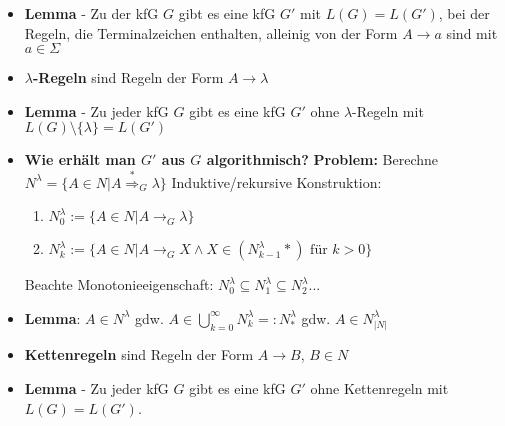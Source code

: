 \documentclass[12pt, a4paper]{article}
\begin{document}
\begin{itemize}
		\item \textbf{Lemma} - Zu der kfG $G$ gibt es eine kfG $G'$ mit $L(G)=L(G')$, bei der Regeln, die
		Terminalzeichen enthalten, alleinig von der Form $A\rightarrow a$ sind mit $a\in\Sigma$
		
		\item \textbf{$\lambda$-Regeln} sind Regeln der Form $A\rightarrow\lambda$
		
		\item \textbf{Lemma} - Zu jeder kfG $G$ gibt es eine kfG $G'$ ohne $\lambda$-Regeln mit $L(G)\setminus\{\lambda\}=L(G')$
		
		\item \textbf{Wie erhält man $G'$ aus $G$ algorithmisch?}
			\subitem \textbf{Problem:} Berechne $N^{\lambda}=\{A\in N|A\overset{\ast}{\Rightarrow}_{G}\lambda\}$
			\subitem Induktive/rekursive Konstruktion:
			\begin{enumerate}
				\item $N^{\lambda}_{0}:=\{A\in N|A\rightarrow_{G}\lambda \}$
				\item $N^{\lambda}_{k}:=\{A\in N|A\rightarrow_{G}X\wedge X\in(N^{\lambda}_{k-1}*)\text{ für }k>0 \}$
			\end{enumerate}
			\subitem Beachte Monotonieeigenschaft: $N^{\lambda}_{0}\subseteq N^{\lambda}_{1}\subseteq N^{\lambda}_{2}...$
			
		\item \textbf{Lemma}: $A\in N^{\lambda}$ gdw. $A\in\bigcup^{\infty}_{k=0}N^{\lambda}_{k}=:N^{\lambda}_{*}$ gdw. $A\in N^{\lambda}_{|N|}$
		
		\item \textbf{Kettenregeln} sind Regeln der Form $A\rightarrow B$, $B\in N$
		
		\item \textbf{Lemma} - Zu jeder kfG $G$ gibt es eine kfG $G'$ ohne Kettenregeln mit $L(G)=L(G')$.
		
	\end{itemize}
\end{document}

